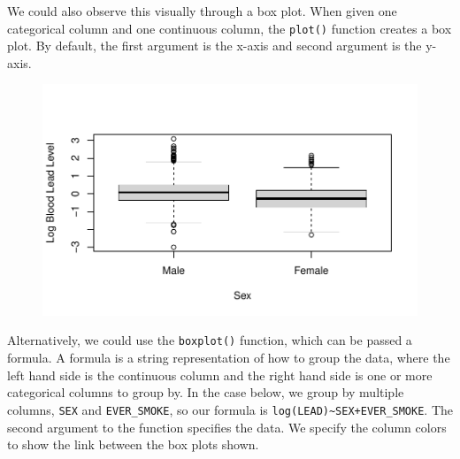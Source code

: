 \documentclass[
  letterpaper,
]{krantz}
\makeatletter
\newenvironment{Shaded}{\begin{snugshade}}{\end{snugshade}}
\newcommand{\AttributeTok}[1]{\textcolor[rgb]{0.40,0.45,0.13}{#1}}
\newcommand{\FunctionTok}[1]{\textcolor[rgb]{0.28,0.35,0.67}{#1}}
\newcommand{\NormalTok}[1]{\textcolor[rgb]{0.00,0.23,0.31}{#1}}
\newcommand{\SpecialCharTok}[1]{\textcolor[rgb]{0.37,0.37,0.37}{#1}}
\newcommand{\StringTok}[1]{\textcolor[rgb]{0.13,0.47,0.30}{#1}}
\newenvironment{kframe}{%
\medskip{}
\setlength{\fboxsep}{.8em}
 \def\at@end@of@kframe{}%
 \ifinner\ifhmode%
  \def\at@end@of@kframe{\end{minipage}}%
  \begin{minipage}{\columnwidth}%
 \fi\fi%
 \def\FrameCommand##1{\hskip\@totalleftmargin \hskip-\fboxsep
 \colorbox{shadecolor}{##1}\hskip-\fboxsep
     \hskip-\linewidth \hskip-\@totalleftmargin \hskip\columnwidth}%
 \MakeFramed {\advance\hsize-\width
   \@totalleftmargin\z@ \linewidth\hsize
   \@setminipage}}%
 {\par\unskip\endMakeFramed%
 \at@end@of@kframe}
\renewenvironment{Shaded}{\begin{kframe}}{\end{kframe}}
\makeatother
\begin{document}
We could also observe this visually through a box plot. When given one
categorical column and one continuous column, the \texttt{plot()}
function creates a box plot. By default, the first argument is the
x-axis and second argument is the y-axis.

\begin{Shaded}
\end{Shaded}

\begin{figure}[H]

{\centering \includegraphics[width=1\textwidth,height=\textheight]{book/4_exploratory_analysis_files/figure-pdf/unnamed-chunk-15-1.pdf}

}

\end{figure}

Alternatively, we could use the \texttt{boxplot()} function, which can
be passed a formula. A formula is a string representation of how to
group the data, where the left hand side is the continuous column and
the right hand side is one or more categorical columns to group by. In
the case below, we group by multiple columns, \texttt{SEX} and
\texttt{EVER\_SMOKE}, so our formula is
\texttt{log(LEAD)\textasciitilde{}SEX+EVER\_SMOKE}. The second argument
to the function specifies the data. We specify the column colors to show
the link between the box plots shown.
\end{document}

